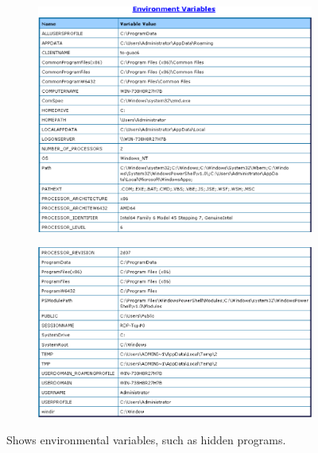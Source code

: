 \begin{figure}[H]
    \centering
    \begin{subfigure}[b]{0.49\textwidth}
        \centering
        \includegraphics[width=\textwidth]{figures/pic10.png}
    \end{subfigure}
    \begin{subfigure}[b]{0.49\textwidth}
        \centering
        \includegraphics[width=\textwidth]{figures/pic11.png}
    \end{subfigure}
    \caption{Shows environmental variables, such as hidden programs.}
\end{figure}

